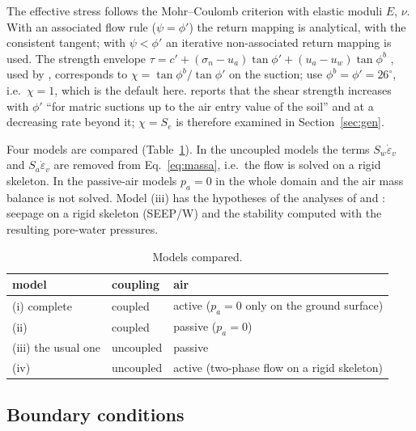 \documentclass[preprint,12pt,authoryear]{elsarticle}
\begin{document}
The effective stress follows the Mohr--Coulomb criterion with elastic moduli $E$, $\nu$. With an associated flow rule
($\psi=\phi'$) the return mapping is analytical, with the consistent tangent; with $\psi<\phi'$ an iterative
non-associated return mapping is used. The strength envelope $\tau=c'+(\sigma_n-u_a)\tan\phi'+(u_a-u_w)\tan\phi^b$
\citep{fredlund1978}, used by \citet[p.~324]{tang2018}, corresponds to $\chi=\tan\phi^b/\tan\phi'$ on the suction;
\citet[p.~1533]{rahardjo2007} use $\phi^b=\phi'=26^\circ$, i.e.\ $\chi=1$, which is the default here.
\citet[p.~312]{fredlund2006} reports that the shear strength increases with $\phi'$ ``for matric suctions up to the air
entry value of the soil'' and at a decreasing rate beyond it; $\chi=S_e$ is therefore examined in
Section~\ref{sec:gen}.

Four models are compared (Table~\ref{tab:modelos}). In the uncoupled models the terms $S_w\dot\varepsilon_v$ and
$S_a\dot\varepsilon_v$ are removed from Eq.~\eqref{eq:massa}, i.e.\ the flow is solved on a rigid skeleton. In the
passive-air models $p_a=0$ in the whole domain and the air mass balance is not solved. Model (iii) has the
hypotheses of the analyses of \citet{rahardjo2007} and \citet{tang2018}: seepage on a rigid skeleton (SEEP/W) and the
stability computed with the resulting pore-water pressures.

\begin{table}[htbp]
\centering\small
\caption{Models compared.}\label{tab:modelos}
\begin{tabular}{lll}
\toprule
model & coupling & air\\
\midrule
(i) complete & coupled & active ($p_a=0$ only on the ground surface)\\
(ii) & coupled & passive ($p_a=0$)\\
(iii) the usual one & uncoupled & passive\\
(iv) & uncoupled & active (two-phase flow on a rigid skeleton)\\
\bottomrule
\end{tabular}
\end{table}

\subsection{Boundary conditions}
\end{document}
